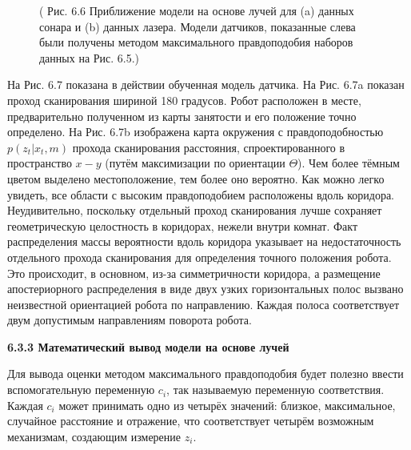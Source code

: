 \documentclass[10pt,a4paper]{article}
\begin{document}
\begin{figure}[H]
	\caption{ (  Рис. 6.6 Приближение модели на основе лучей для (a) данных сонара и (b) данных лазера. Модели датчиков, показанные слева были получены методом максимального правдоподобия наборов данных на Рис. 6.5.)}
	\label{fig:66orig}
\end{figure}

На Рис. 6.7 показана в действии обученная модель датчика. На Рис. 6.7a показан проход сканирования шириной 180 градусов. Робот расположен в месте, предварительно полученном из карты занятости и его положение точно определено. На Рис. 6.7b изображена карта окружения с правдоподобностью $p(z_t | x_t, m)$  прохода сканирования расстояния, спроектированного в пространство $x-y$ (путём максимизации по ориентации $\varTheta$). Чем более тёмным цветом выделено местоположение, тем более оно вероятно. Как можно легко увидеть, все области с высоким правдоподобием расположены вдоль коридора. Неудивительно, поскольку отдельный проход сканирования лучше сохраняет геометрическую целостность в коридорах, нежели внутри комнат. Факт распределения массы вероятности вдоль коридора указывает на недостаточность отдельного прохода сканирования для определения точного положения робота. Это происходит, в основном, из-за симметричности коридора, а размещение апостериорного распределения в виде двух узких горизонтальных полос вызвано неизвестной ориентацией робота по направлению. Каждая полоса соответствует двум допустимым направлениям поворота робота. 

\textbf{6.3.3 Математический вывод модели на основе лучей}

Для вывода оценки методом максимального правдоподобия будет полезно ввести вспомогательную переменную $c_i$, так называемую переменную соответствия. Каждая $c_i$ может принимать одно из четырёх значений:  близкое, максимальное, случайное расстояние и отражение, что соответствует четырём возможным механизмам, создающим измерение $z_i$.
\end{document}
